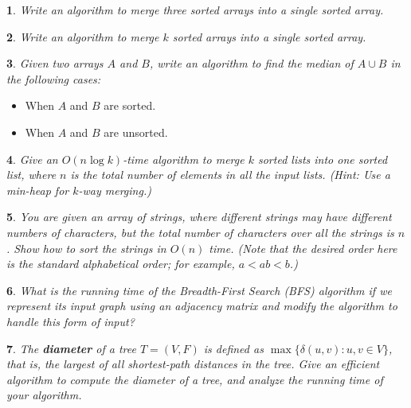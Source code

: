 \documentclass[%
addpoints]{exam}
\theoremstyle{problem}
\newtheorem{p}{}
\begin{document}
\begin{p}
Write an algorithm to merge three sorted arrays into a single sorted array.\\
\hfill \end{p}

\begin{p}
Write an algorithm to merge \( k \) sorted arrays into a single sorted array.\\
\hfill \end{p}

\begin{p}
Given two arrays \( A \) and \( B \), write an algorithm to find the median of \( A \cup B \) in the following cases:  
\hfill \end{p}
\begin{itemize}
    \item When \( A \) and \( B \) are sorted.
    \item When \( A \) and \( B \) are unsorted.
\end{itemize}

\begin{p}
Give an \( O(n \log k) \)-time algorithm to merge \( k \) sorted lists into one sorted list,  
where \( n \) is the total number of elements in all the input lists. (Hint: Use a min-heap for \( k \)-way merging.)
\hfill \end{p}

\begin{p}
You are given an array of strings, where different strings may have different  
numbers of characters, but the total number of characters over all the strings  
is \( n \). Show how to sort the strings in \( O(n) \) time.  
(Note that the desired order here is the standard alphabetical order; for example,  
\( a < ab < b \).)
\hfill \end{p}

\begin{p}
What is the running time of the Breadth-First Search (BFS) algorithm if we represent its input graph using an adjacency matrix and modify the algorithm to handle this form of input?
\hfill \end{p}

\begin{p}
The \textbf{diameter} of a tree \( T = (V, F) \) is defined as \( \max \{ \delta(u, v) : u, v \in V \} \), that is, the largest of all shortest-path distances in the tree. Give an efficient algorithm to compute the diameter of a tree, and analyze the running time of your algorithm.
\hfill \end{p}
\end{document}
